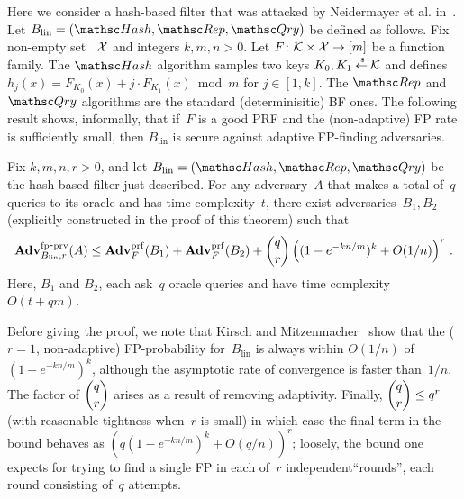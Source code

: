 Here we consider a hash-based filter that was attacked by Neidermayer et al. in~\cite{xxx}.  Let $B_{\mathrm{lin}}=(\Hash,\Rep,\Qry)$ be defined as follows.  Fix non-empty set ~${\cal X}$ and integers $k,m,n>0$.  Let $F\colon\mathcal{K} \times {\cal X} \to [m]$ be a function family.  The $\Hash$ algorithm samples two keys $K_0,K_1 {\:\stackrel{{\scriptscriptstyle \hspace{0.2em}\$}} {\leftarrow}\:} \mathcal{K}$ and defines $h_j(x) = F_{K_0}(x) + j\cdot F_{K_1}(x) \bmod m$ for $j \in [1,k]$.  The $\Rep$ and $\Qry$ algorithms are the standard (determinisitic) BF ones. The following result shows, informally, that if~$F$ is a good PRF and the (non-adaptive) FP rate is sufficiently small, then $B_\mathrm{lin}$ is secure against adaptive FP-finding adversaries.

\begin{theorem}\label{thm1}
Fix $k,m,n,r>0$, and let $B_\mathrm{lin}=(\Hash,\Rep,\Qry)$ be the hash-based filter just described. 
For any adversary~$A$ that makes a total of~$q$ queries to its oracle
and has time-complexity~$t$,
there exist adversaries~$B_1,B_2$ (explicitly constructed in the proof of this theorem) such that
\[
\mathrm{\mathbf{Adv}}^{\mathrm{fp\mbox{-}prv}}_{B_{\mathrm{lin}},r}(A) \leq  \mathbf{Adv}^{\mathrm{prf}}_{F}(B_1) + \mathbf{Adv}^{\mathrm{prf}}_{F}(B_2)  +{\dbinom{q}{r}} \left( (1-e^{-kn/m})^k + O(1/n) \right)^r\,.
\]
Here, $B_1$ and $B_2$, each ask~$q$ oracle queries and have time complexity~$O(t+qm)$.
\end{theorem}
Before giving the proof, we note that Kirsch and Mitzenmacher~\cite{xxx} show
that the ($r=1$, non-adaptive) FP-probability for~$B_\mathrm{lin}$ is
always within $O(1/n)$ of $(1-e^{-kn/m})^k$, although the asymptotic
rate of convergence is faster than~$1/n$.  The factor of $\dbinom{q}{r}$ arises as a result
of removing adaptivity.  Finally, $\dbinom{q}{r} \leq q^r$ (with
reasonable tightness when~$r$ is small) in which case the final term in the bound behaves as 
$(q (1-e^{-kn/m})^k + O(q/n) )^r$; loosely, the bound one expects for
trying to find a single FP in each of~$r$ independent``rounds'', each round
consisting of~$q$ attempts.
%
